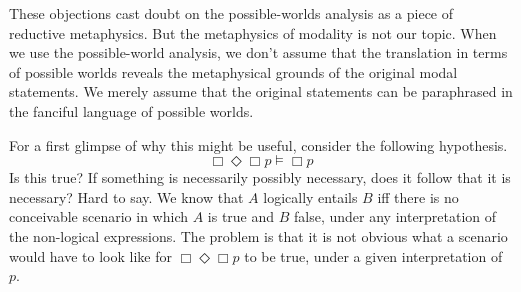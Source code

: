 These objections cast doubt on the possible-worlds analysis as a piece of
reductive metaphysics. But the metaphysics of modality is not our topic. When we
use the possible-world analysis, we don't assume that the translation in terms
of possible worlds reveals the metaphysical grounds of the original modal
statements. We merely assume that the original statements can be paraphrased in
the fanciful language of possible worlds.





For a first glimpse of why this might be useful, consider the following
hypothesis.
%
\begin{equation*}
  \Box\Diamond\Box p \models \Box p
\end{equation*}
% 
Is this true? If something is necessarily possibly necessary, does it follow
that it is necessary? Hard to say. We know that $A$ logically entails $B$ iff
there is no conceivable scenario in which $A$ is true and $B$ false, under any
interpretation of the non-logical expressions. The problem is that it is not
obvious what a scenario would have to look like for $\Box \Diamond \Box p$ to be
true, under a given interpretation of $p$.

